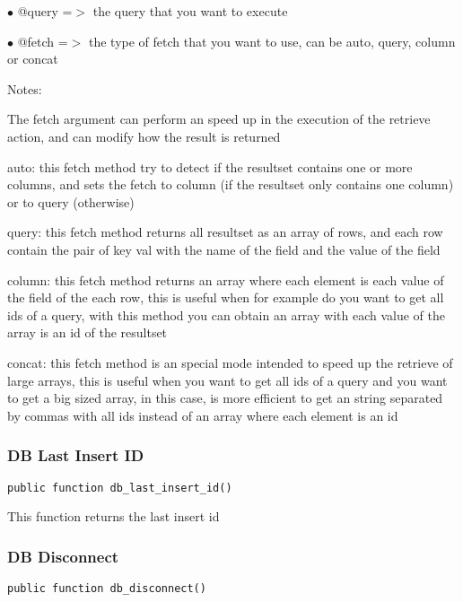 \documentclass[a4paper]{article}
\begin{document}
\begin{compactitem}
\item[\color{myblue}$\bullet$] @query =$>$ the query that you want to execute
\item[\color{myblue}$\bullet$] @fetch =$>$ the type of fetch that you want to use, can be auto, query, column or concat
\end{compactitem}

Notes:

The fetch argument can perform an speed up in the execution of the retrieve action, and
can modify how the result is returned

auto: this fetch method try to detect if the resultset contains one or more columns, and
sets the fetch to column (if the resultset only contains one column) or to query (otherwise)

query: this fetch method returns all resultset as an array of rows, and each row contain the
pair of key val with the name of the field and the value of the field

column: this fetch method returns an array where each element is each value of the field of
the each row, this is useful when for example do you want to get all ids of a query, with
this method you can obtain an array with each value of the array is an id of the resultset

concat: this fetch method is an special mode intended to speed up the retrieve of large
arrays, this is useful when you want to get all ids of a query and you want to get a big
sized array, in this case, is more efficient to get an string separated by commas with all
ids instead of an array where each element is an id

\hypertarget{toc360}{}
\subsubsection{DB Last Insert ID}

\begin{lstlisting}
public function db_last_insert_id()
\end{lstlisting}

This function returns the last insert id

\hypertarget{toc361}{}
\subsubsection{DB Disconnect}

\begin{lstlisting}
public function db_disconnect()
\end{lstlisting}
\end{document}
